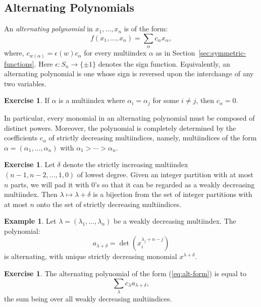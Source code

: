 \documentclass[12pt]{amsart}
\theoremstyle{definition}
\theoremstyle{example}
\newtheorem{example}[theorem]{Example}
\newtheorem{exercise}[theorem]{Exercise}
\begin{document}
\subsection{Alternating Polynomials}
\label{sec:alt-poly}
An \emph{alternating polynomial} in $x_1,\dotsc, x_n$ is of the form:
\begin{equation}
  \label{eq:alt-form}
  f(x_1,\dotsc,x_n) = \sum_{\alpha} c_\alpha x_\alpha,
\end{equation}
where, $c_{w(\alpha)} = \epsilon(w)c_\alpha$ for every multiindex $\alpha$ as in Section~\ref{sec:symmetric-functions}.
Here $\epsilon:S_n\to \{\pm 1\}$ denotes the sign function.
Equivalently, an alternating polynomial is one whose sign is reversed upon the interchange of any two variables.
\begin{exercise}
  If $\alpha$ is a multiindex where $\alpha_i=\alpha_j$ for some $i\neq j$, then $c_\alpha = 0$.
\end{exercise}
In particular, every monomial in an alternating polynomial must be composed of distinct powers.
Moreover, the polynomial is completely determined by the coefficients $c_\alpha$ of strictly decreasing multiindices, namely, multiindices of the form $\alpha=(\alpha_1,\dotsc,\alpha_n)$ with $\alpha_1>\dotsb>\alpha_n$.
\begin{exercise}
  Let $\delta$ denote the strictly increasing multiindex $(n-1,n-2,\dotsc,1, 0)$ of lowest degree.
  Given an integer partition with at most $n$ parts, we will pad it with $0$'s so that it can be regarded as a weakly decreasing multiindex.
  Then $\lambda\mapsto \lambda+\delta$ is a bijection from the set of integer partitions with at most $n$ onto the set of strictly decreasing multiindices.
\end{exercise}
\begin{example}
  Let $\lambda = (\lambda_1,\dotsc, \lambda_n)$ be a weakly decreasing multiindex.
  The polynomial:
  \begin{displaymath}
    a_{\lambda+\delta} = \det(x_i^{\lambda_j + n - j})
  \end{displaymath}
  is alternating, with unique strictly decreasing monomial $x^{\lambda+\delta}$.
\end{example}
\begin{exercise}
  \label{exercise:alt-basis}
  The alternating polynomial of the form \textup{(\ref{eq:alt-form})} is equal to  \begin{displaymath}
    \sum_{\lambda} c_\lambda a_{\lambda+\delta},
  \end{displaymath}
  the sum being over all weakly decreasing multiindices.
\end{exercise}
\end{document}
